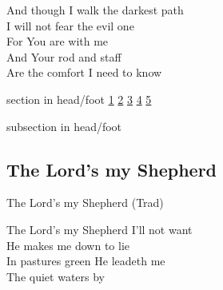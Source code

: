 \documentclass{beamer}
\begin{document}
{\begin{frame}{}
\end{frame}

\hypertarget{The Lord's my Shepherd['Psalm 23'](Townend)3}{}
\begin{frame}{}
\fontsize{ 20 }{ 27 }\selectfont

And though I walk the darkest path\\ 
I will not fear the evil one\\ 
For You are with me\\ 
And Your rod and staff\\ 
Are the comfort I need to know 

\end{frame}

}
{
{ 
 {
 \begin{beamercolorbox}[ht=4.5ex,dp=1.5ex,%
      leftskip=.3cm,rightskip=.3cm plus1fil]{section in head/foot}
 \fontsize{12}{25}\selectfont 
\hyperlink{The Lord's my Shepherd['Psalm 23'](Trad)1}{1}
\hyperlink{The Lord's my Shepherd['Psalm 23'](Trad)2}{2}
\hyperlink{The Lord's my Shepherd['Psalm 23'](Trad)3}{3}
\hyperlink{The Lord's my Shepherd['Psalm 23'](Trad)4}{4}
\hyperlink{The Lord's my Shepherd['Psalm 23'](Trad)5}{5}
 
 \end{beamercolorbox}%
  \begin{beamercolorbox}[ht=2.5ex,dp=1.125ex,%
   leftskip=.3cm,rightskip=.3cm plus1fil]{subsection in head/foot}
   \insertauthor
 \end{beamercolorbox}%
 }
}
\subsection{ The Lord's my Shepherd }

\hypertarget{The Lord's my Shepherd['Psalm 23'](Trad)1}{}
\begin{frame}{The Lord's my Shepherd (Trad)}
\fontsize{ 18 }{ 23 }\selectfont

The Lord's my Shepherd I'll not want\\ 
He makes me down to lie\\ 
In pastures green He leadeth me\\ 
The quiet waters by 

\end{frame}

\hypertarget{The Lord's my Shepherd['Psalm 23'](Trad)2}{}
\begin{frame}{}
\fontsize{ 18 }{ 23 }\selectfont


\end{frame}}
\end{document}
